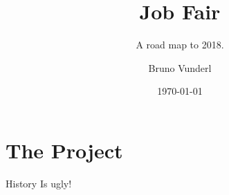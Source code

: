 \documentclass{beamer}
\title{Job Fair}
\subtitle{A road map to 2018.}
\date{\today}
\author{Bruno Vunderl}
\institute{Klub studenata elektrotehnike}
\begin{document}
	\maketitle
	
	\section{The Project}
	
	\begin{frame}{History}
	Is ugly!
	\end{frame}
\end{document}
